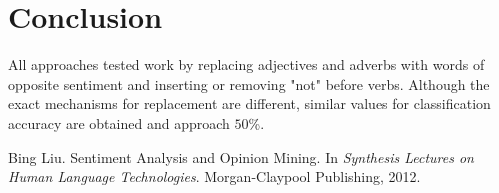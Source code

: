 \documentclass[11pt,a4paper]{article}
\begin{document}
\section{Conclusion}
All approaches tested work by replacing adjectives and adverbs with words of opposite sentiment and inserting or removing "not" before verbs. Although the exact mechanisms for replacement are different,  similar values for classification accuracy are obtained and approach $50$\%.\\


\begin{thebibliography}{9}
Bing Liu. Sentiment Analysis and Opinion Mining.
In \textit{Synthesis Lectures on Human Language Technologies}. 
Morgan-Claypool Publishing, 2012.
\end{thebibliography}
\end{document}
